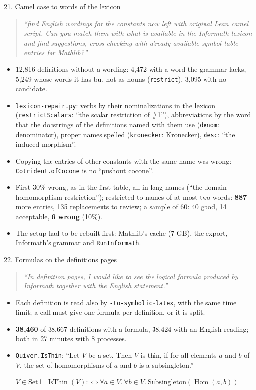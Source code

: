 \documentclass[10pt,aspectratio=169]{beamer}
\newcommand{\bad}[1]{\textcolor{warn}{#1}}
\newcommand{\ok}[1]{\textcolor{good}{#1}}
\newcommand{\prompt}[1]{\begin{quote}\small\itshape ``#1''\end{quote}}
\begin{document}
\begin{frame}{21. Camel case to words of the lexicon}
  \footnotesize
  \prompt{find English wordings for the constants now left with original Lean camel script.
  Can you match them with what is available in the Informath lexicon and find suggestions,
  cross-checking with already available symbol table entries for Mathlib?}
  \begin{itemize}
    \item 12,816 definitions without a wording: 4,472 with a word the grammar lacks, 5,249
          whose words it has but not as nouns (\texttt{restrict}), 3,095 with no candidate.
    \item \texttt{lexicon-repair.py}: verbs by their nominalizations in the lexicon
          (\texttt{restrictScalars}: \ok{``the scalar restriction of \#1''}), abbreviations by
          the word that the docstrings of the definitions named with them use (\texttt{denom}:
          \ok{denominator}), proper names spelled (\texttt{kronecker}: \ok{Kronecker}),
          \texttt{desc}: \ok{``the induced morphism''}.
    \item Copying the entries of other constants with the same name was \bad{wrong}:
          \texttt{Cotrident.ofCocone} is no \bad{``pushout cocone''}.
    \item First 30\% wrong, as in the first table, all in long names
          (\bad{``the domain homomorphism restriction''}); restricted to names of at most two
          words: \textbf{887} more entries, 135 replacements to review; a sample of 60:
          40 good, 14 acceptable, \textbf{6 wrong} (10\%).
    \item The setup had to be rebuilt first: Mathlib's cache (7 GB), the export, Informath's
          grammar and \texttt{RunInformath}.
  \end{itemize}
\end{frame}

\begin{frame}{22. Formulas on the definitions pages}
  \small
  \prompt{In definition pages, I would like to see the logical formula produced by Informath
  together with the English statement.}
  \begin{itemize}
    \item Each definition is read also by \texttt{-to-symbolic-latex}, with the same time
          limit; a call must give one formula per definition, or it is split.
    \item \textbf{38,460} of 38,667 definitions with a formula, 38,424 with an English
          reading; both in 27 minutes with 8 processes.
    \item \texttt{Quiver.IsThin}: ``Let $V$ be a set. Then $V$ is thin, if for all elements $a$
          and $b$ of $V$, the set of homomorphisms of $a$ and $b$ is a subsingleton.''

          $V \in \mathrm{Set} \vdash \operatorname{IsThin}(V) :\Leftrightarrow \forall a \in V .\
          \forall b \in V .\ \mathrm{Subsingleton}(\operatorname{Hom}(a, b))$
  \end{itemize}
\end{frame}
\end{document}
